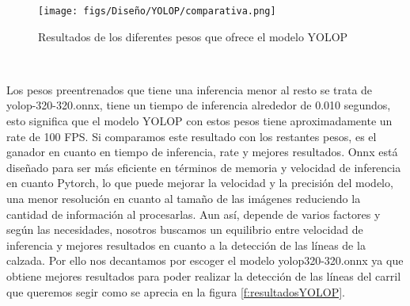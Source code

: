 \begin{figure} [H]
  \begin{center}
    \texttt{[image: figs/Diseño/YOLOP/comparativa.png]}
  \end{center}
  \caption{Resultados de los diferentes pesos que ofrece el modelo YOLOP}
  \label{fig:resultados_pesos_preentrenados}
\end{figure}\

Los pesos preentrenados que tiene una inferencia menor al resto se trata de yolop-320-320.onnx, tiene un tiempo de inferencia alrededor de 0.010 segundos, esto
significa que el modelo YOLOP con estos pesos tiene aproximadamente un rate de 100 FPS. Si comparamos este resultado con los restantes pesos, es el ganador en cuanto 
en tiempo de inferencia, rate y mejores resultados. 
Onnx está diseñado para ser más eficiente en términos de memoria y velocidad de inferencia en cuanto Pytorch, lo que puede mejorar la velocidad y la precisión
del modelo, una menor resolución en cuanto al tamaño de las imágenes reduciendo la cantidad de información al procesarlas. Aun así, depende de varios factores y según las necesidades, nosotros
buscamos un equilibrio entre velocidad de inferencia y mejores resultados en cuanto a la detección de las líneas de la calzada. 
Por ello nos decantamos por escoger el modelo yolop320-320.onnx ya que obtiene mejores resultados para poder realizar la detección de las líneas del carril que 
queremos segir como se aprecia en la figura \ref{f:resultadosYOLOP}.\newline

